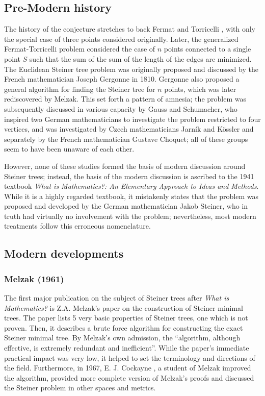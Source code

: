 \documentclass{mpaper}
\begin{document}
\subsection{Pre-Modern history}

The history of the conjecture stretches to back Fermat and Torricelli \cite{Brazil2014}, with only the special case of three points considered originally. Later, the generalized Fermat-Torricelli problem considered the case of $n$ points connected to a single point $S$ such that the sum of the sum of the length of the edges are minimized. The Euclidean Steiner tree problem was originally proposed and discussed by  the French mathematician Joseph Gergonne in 1810. Gergonne also proposed a general algorithm for finding the Steiner tree for $n$ points, which was later rediscovered by Melzak. This set forth a pattern of amnesia; the problem was subsequently discussed in various capacity by Gauss and Schumacher, who inspired two German mathematicians to investigate the problem restricted to four vertices, and was investigated by Czech mathematicians Jarník and Kössler and separately by the French mathematician Gustave Choquet; all of these groups seem to have been unaware of each other.

However, none of these studies formed the basis of modern discussion around Steiner trees; instead, the basis of the modern discussion is ascribed to the 1941 textbook \emph{What is Mathematics?: An Elementary Approach to Ideas and Methods}\cite{courant1996mathematics}. While it is a highly regarded textbook, it mistakenly states that the problem was proposed and developed by the German mathematician Jakob Steiner, who in truth had virtually no involvement with the problem; nevertheless, most modern treatments follow this erroneous nomenclature.
\subsection{Modern developments}
\subsubsection{Melzak (1961) \cite{melzak_1961}}
The first major publication on the subject of Steiner trees after \emph{What is Mathematics?} is Z.A. Melzak's paper on the construction of Steiner minimal trees. The paper lists 5 very basic properties of Steiner trees, one which is not proven. Then, it describes a brute force algorithm for constructing the exact Steiner minimal tree. By Melzak's own admission, the ``algorithm, although effective, is extremely redundant and inefficient''. While the paper's immediate practical impact was very low, it helped to set the terminology and directions of the field. Furthermore, in 1967,  E. J. Cockayne \cite{cockayne_1967}, a student of Melzak improved the algorithm, provided more complete version of Melzak's proofs and discussed the Steiner problem in other spaces and metrics.
\end{document}
